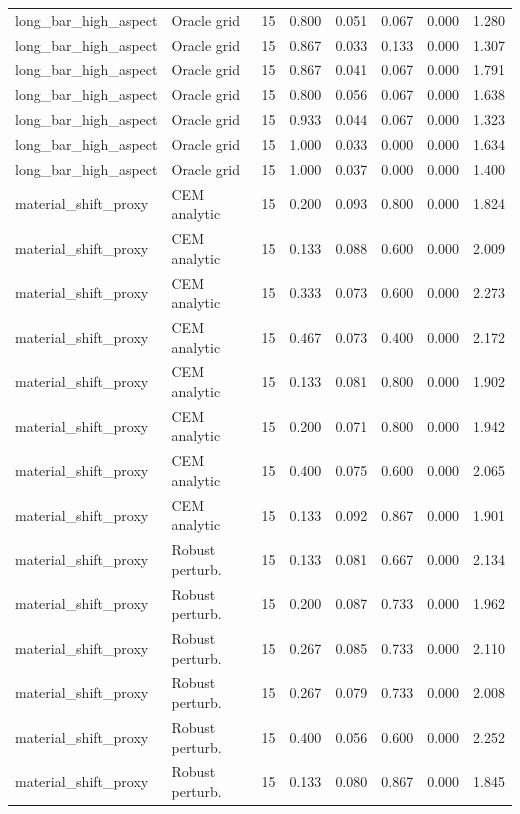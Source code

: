 {\begin{longtable}{llrrrrrr}
long\_bar\_high\_aspect & Oracle grid & 15 & 0.800 & 0.051 & 0.067 & 0.000 & 1.280 \\
long\_bar\_high\_aspect & Oracle grid & 15 & 0.867 & 0.033 & 0.133 & 0.000 & 1.307 \\
long\_bar\_high\_aspect & Oracle grid & 15 & 0.867 & 0.041 & 0.067 & 0.000 & 1.791 \\
long\_bar\_high\_aspect & Oracle grid & 15 & 0.800 & 0.056 & 0.067 & 0.000 & 1.638 \\
long\_bar\_high\_aspect & Oracle grid & 15 & 0.933 & 0.044 & 0.067 & 0.000 & 1.323 \\
long\_bar\_high\_aspect & Oracle grid & 15 & 1.000 & 0.033 & 0.000 & 0.000 & 1.634 \\
long\_bar\_high\_aspect & Oracle grid & 15 & 1.000 & 0.037 & 0.000 & 0.000 & 1.400 \\
material\_shift\_proxy & CEM analytic & 15 & 0.200 & 0.093 & 0.800 & 0.000 & 1.824 \\
material\_shift\_proxy & CEM analytic & 15 & 0.133 & 0.088 & 0.600 & 0.000 & 2.009 \\
material\_shift\_proxy & CEM analytic & 15 & 0.333 & 0.073 & 0.600 & 0.000 & 2.273 \\
material\_shift\_proxy & CEM analytic & 15 & 0.467 & 0.073 & 0.400 & 0.000 & 2.172 \\
material\_shift\_proxy & CEM analytic & 15 & 0.133 & 0.081 & 0.800 & 0.000 & 1.902 \\
material\_shift\_proxy & CEM analytic & 15 & 0.200 & 0.071 & 0.800 & 0.000 & 1.942 \\
material\_shift\_proxy & CEM analytic & 15 & 0.400 & 0.075 & 0.600 & 0.000 & 2.065 \\
material\_shift\_proxy & CEM analytic & 15 & 0.133 & 0.092 & 0.867 & 0.000 & 1.901 \\
material\_shift\_proxy & Robust perturb. & 15 & 0.133 & 0.081 & 0.667 & 0.000 & 2.134 \\
material\_shift\_proxy & Robust perturb. & 15 & 0.200 & 0.087 & 0.733 & 0.000 & 1.962 \\
material\_shift\_proxy & Robust perturb. & 15 & 0.267 & 0.085 & 0.733 & 0.000 & 2.110 \\
material\_shift\_proxy & Robust perturb. & 15 & 0.267 & 0.079 & 0.733 & 0.000 & 2.008 \\
material\_shift\_proxy & Robust perturb. & 15 & 0.400 & 0.056 & 0.600 & 0.000 & 2.252 \\
material\_shift\_proxy & Robust perturb. & 15 & 0.133 & 0.080 & 0.867 & 0.000 & 1.845 \\

\end{longtable}}
